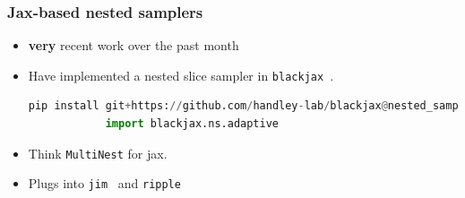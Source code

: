 \documentclass[aspectratio=169]{beamer}
\begin{document}
\begin{frame}[fragile]
    \frametitle{Jax-based nested samplers}
    \begin{itemize}
        \item \textbf{very} recent work over the past month
        \item Have implemented a nested slice sampler in \texttt{blackjax}~.
            \begin{lstlisting}[language=Python]
            pip install git+https://github.com/handley-lab/blackjax@nested_sampling
            import blackjax.ns.adaptive\end{lstlisting}
        \item Think \texttt{MultiNest} for jax.
        \item Plugs into \texttt{jim}~ and \texttt{ripple}~
    \end{itemize}
\end{frame}
\end{document}
